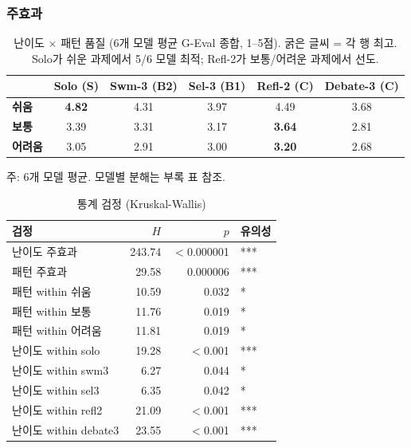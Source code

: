 \documentclass[a4paper,11pt]{article}
\begin{document}
\subsubsection{주효과}

\begin{table}[H]
\centering
\caption{난이도 $\times$ 패턴 품질 (6개 모델 평균 G-Eval 종합, 1--5점). 굵은 글씨 = 각 행 최고. Solo가 쉬운 과제에서 5/6 모델 최적; Refl-2가 보통/어려운 과제에서 선도.}
\label{tab:difficulty-heatmap}
{\small
\begin{tabular}{lccccc}
\toprule
 & Solo (S) & Swm-3 (B2) & Sel-3 (B1) & Refl-2 (C) & Debate-3 (C) \\
\midrule
\textbf{쉬움}   & \textbf{4.82} & 4.31 & 3.97 & 4.49 & 3.68 \\
\textbf{보통}   & 3.39 & 3.31 & 3.17 & \textbf{3.64} & 2.81 \\
\textbf{어려움} & 3.05 & 2.91 & 3.00 & \textbf{3.20} & 2.68 \\
\bottomrule
\end{tabular}
}

\smallskip
{\footnotesize 주: 6개 모델 평균. 모델별 분해는 부록 표 참조.}
\end{table}

\begin{table}[H]
\centering
\caption{통계 검정 (Kruskal-Wallis)}
\label{tab:kw-difficulty}
{\small
\begin{tabular}{lrrl}
\toprule
검정 & $H$ & $p$ & 유의성 \\
\midrule
난이도 주효과             & 243.74 & $<$0.000001 & *** \\
패턴 주효과               & 29.58  & 0.000006    & *** \\
패턴 within 쉬움          & 10.59 & 0.032       & * \\
패턴 within 보통          & 11.76 & 0.019       & * \\
패턴 within 어려움        & 11.81 & 0.019       & * \\
난이도 within solo        & 19.28 & $<$0.001    & *** \\
난이도 within swm3        & 6.27  & 0.044       & * \\
난이도 within sel3        & 6.35  & 0.042       & * \\
난이도 within refl2       & 21.09 & $<$0.001    & *** \\
난이도 within debate3     & 23.55 & $<$0.001    & *** \\
\bottomrule
\end{tabular}
}
\end{table}
\end{document}
